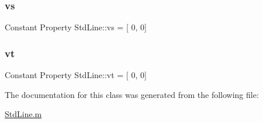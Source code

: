 \mbox{\label{class_std_line_a08ece13617006002fcf0ddc15dbdab8e}} 
\subsubsection{\texorpdfstring{vs}{vs}}
{\footnotesize\ttfamily Constant Property Std\+Line\+::vs = \mbox{[} 0, 0\mbox{]}\textquotesingle{}}

\mbox{\label{class_std_line_a6ab5371552e38c477208bd2671b5fd44}} 
\subsubsection{\texorpdfstring{vt}{vt}}
{\footnotesize\ttfamily Constant Property Std\+Line\+::vt = \mbox{[} 0, 0\mbox{]}\textquotesingle{}}



The documentation for this class was generated from the following file\+:\begin{DoxyCompactItemize}
\item 
\hyperlink{_std_line_8m}{Std\+Line.\+m}\end{DoxyCompactItemize}
